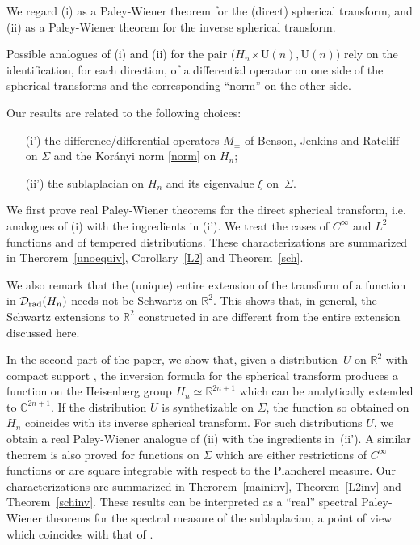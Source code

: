 \documentclass[12pt,a4paper]{amsart}
\theoremstyle{plain}
\theoremstyle{definition}
\numberwithin{equation}{section}
\begin{document}
 We regard (i) as a Paley-Wiener theorem for the (direct) spherical transform, and (ii) as a Paley-Wiener theorem for the inverse spherical transform.
 
Possible  analogues of (i) and (ii) for the pair $\big({{H_{n}}}\rtimes{{\text{U}({n})}},{{\text{U}({n})}}\big)$ rely on the identification, for each direction, of  a differential operator on one side of the spherical transforms and the corresponding ``norm'' on the other side. 

Our results are related to the following choices:
\begin{enumerate}
\item[(i')]  the difference/differential  operators $M_\pm$ of Benson, Jenkins and Ratcliff \cite{BJR} on $\Sigma$ and the Kor\'anyi norm   \eqref{norm} on $H_n$;
\item[(ii')] the sublaplacian on $H_n$ and its eigenvalue $\xi$ on~$\Sigma$.
\end{enumerate}

We first prove real Paley-Wiener theorems for the direct spherical transform, i.e. analogues of (i) with the ingredients in (i'). We
 treat the cases of $C^\infty$ and $L^2$ functions and of  tempered distributions. These characterizations are summarized in Therorem~\ref{unoequiv},  Corollary~\ref{L2} and Theorem~\ref{sch}.   
 
 We also remark that 
the (unique) entire extension of the transform of  a function in ${\mathcal D}_{\text{\rm rad}}({{H_{n}}})$
needs not be Schwartz on ${\mathbb R}^2$. This shows that, in general, the Schwartz extensions 
to ${\mathbb R}^2$ constructed in \cite{ADR1} are  different from  the entire extension discussed here.

 
In the second part of the paper, we show that, given a  distribution~$U$ on ${\mathbb R}^2$ with compact support , the inversion formula for the spherical transform produces a function on the Heisenberg group ${{H_{n}}}\simeq {\mathbb R}^{2{n}+1}$ which can be analytically extended
 to ${\mathbb C}^{2{n}+1}$. 
 If the distribution $U$ is synthetizable on $\Sigma$, the function so obtained on $H_n$ coincides with its inverse spherical transform. For such distributions $U$, we obtain a real Paley-Wiener analogue of (ii) with the ingredients in~(ii').  A similar theorem is also proved for functions on $\Sigma$ which are either restrictions of $C^\infty$ functions or are square integrable with respect to the Plancherel measure.
 Our characterizations are summarized in Therorem~\ref{maininv}, Theorem~\ref{L2inv} and Theorem~\ref{schinv}.
 These results can be interpreted as a ``real''  spectral Paley-Wiener theorems 
 for the spectral measure of the sublaplacian, a point of view which coincides  with that of \cite{MN}. 
\end{document}

